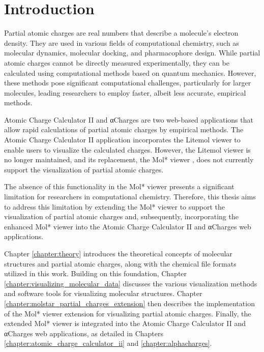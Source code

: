 \documentclass[
  digital,     %
  oneside,     %
  nosansbold,  %
  nocolorbold, %
  lof,         %
  lot,         %
]{fithesis4}
\begin{document}
\newpage
\chapter*{Introduction}

Partial atomic charges are real numbers that describe a molecule's electron density. They are used in various fields of computational chemistry, such as molecular dynamics, molecular docking, and pharmacophore design. \cite{racek2022thesis} While partial atomic charges cannot be directly measured experimentally, they can be calculated using computational methods based on quantum mechanics. \cite{gupta2015principles} However, these methods pose significant computational challenges, particularly for larger molecules, leading researchers to employ faster, albeit less accurate, empirical methods. \cite{schindler2019thesis}

Atomic Charge Calculator II \cite{racek2020acc2} and αCharges \cite{schindler2023alphacharges} are two web-based applications that allow rapid calculations of partial atomic charges by empirical methods. The Atomic Charge Calculator II application incorporates the Litemol viewer \cite{sehnal2017litemol} to enable users to visualize the calculated charges. However, the Litemol viewer is no longer maintained, and its replacement, the Mol* viewer \cite{sehnal2021molstar}, does not currently support the visualization of partial atomic charges.

The absence of this functionality in the Mol* viewer presents a significant limitation for researchers in computational chemistry. Therefore, this thesis aims to address this limitation by extending the Mol* viewer to support the visualization of partial atomic charges and, subsequently, incorporating the enhanced Mol* viewer into the Atomic Charge Calculator II and αCharges web applications.

Chapter \ref{chapter:theory} introduces the theoretical concepts of molecular structures and partial atomic charges, along with the chemical file formats utilized in this work. Building on this foundation, Chapter \ref{chapter:visualizing_molecular_data} discusses the various visualization methods and software tools for visualizing molecular structures. Chapter \ref{chapter:molstar_partial_charges_extension} then describes the implementation of the Mol* viewer extension for visualizing partial atomic charges. Finally, the extended Mol* viewer is integrated into the Atomic Charge Calculator II and αCharges web applications, as detailed in Chapters \ref{chapter:atomic_charge_calculator_ii} and \ref{chapter:alphacharges}.
\end{document}
